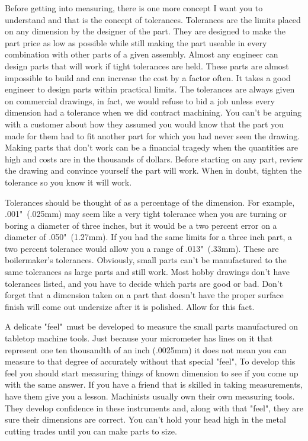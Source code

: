 
Before getting into measuring, there is one more concept I want you to
understand and that is the concept of tolerances. Tolerances are the limits
placed on any dimension by the designer of the part. They are designed to make
the part price as low as possible while still making the part useable in every
combination with other parts of a given assembly. Almost any engineer can design
parts that will work if tight tolerances are held. These parts are almost
impossible to build and can increase the cost by a factor often. It takes a good
engineer to design parts within practical limits. The tolerances are always
given on commercial drawings, in fact, we would refuse to bid a job unless every
dimension had a tolerance when we did contract machining. You can't be arguing
with a customer about how they assumed you would know that the part you made for
them had to fit another part for which you had never seen the drawing. Making
parts that don't work can be a financial tragedy when the quantities are high
and costs are in the thousands of dollars. Before starting on any part, review
the drawing and convince yourself the part will work. When in doubt, tighten the
tolerance so you know it will work.

Tolerances should be thought of as a percentage of the dimension. For example,
.001"\ (.025mm) may seem like a very tight tolerance when you are turning or
boring a diameter of three inches, but it would be a two percent error on a
diameter of .050"\ (1.27mm). If you had the same limits for a three inch part, a
two percent tolerance would allow you a range of .013"\ (.33mm). These are
boilermaker's tolerances. Obviously, small parts can't be manufactured to the
same tolerances as large parts and still work. Most hobby drawings don't have
tolerances listed, and you have to decide which parts are good or bad. Don't
forget that a dimension taken on a part that doesn't have the proper surface
finish will come out undersize after it is polished. Allow for this fact.


A delicate "feel"\ must be developed to measure the small parts manufactured on
tabletop machine tools. Just because your micrometer has lines on it that
represent one ten thousandth of an inch (.0025mm) it does not mean you can
measure to that degree of accurately without that special "feel", To develop
this feel you should start measuring things of known dimension to see if you
come up with the same answer. If you have a friend that is skilled in taking
measurements, have them give you a lesson. Machinists usually own their own
measuring tools. They develop confidence in these instruments and, along with
that "feel", they are sure their dimensions are correct. You can't hold your
head high in the metal cutting trades until you can make parts to size.

